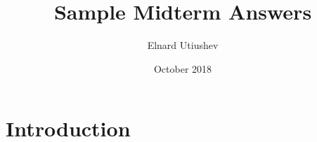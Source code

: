 \documentclass{article}
\title{Sample Midterm Answers}
\author{Elnard Utiushev}
\date{October 2018}
\begin{document}
\maketitle

\section{Introduction}
\end{document}

